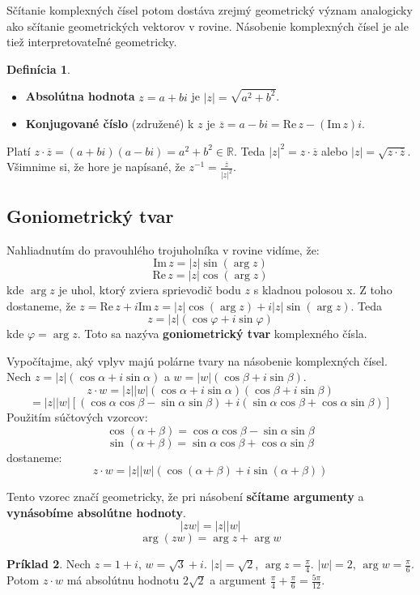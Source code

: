 \documentclass[11pt,a4paper]{article}
\theoremstyle{definition}
\newtheorem{definicia}{Definícia}[section]
\newtheorem{priklad}[definicia]{Príklad}
\theoremstyle{plain}
\theoremstyle{remark}
\newcommand{\R}{\mathbb{R}}
\begin{document}
Sčítanie komplexných čísel potom dostáva zrejmý geometrický význam analogicky ako sčítanie geometrických vektorov v rovine.
Násobenie komplexných čísel je ale tiež interpretovateľné geometricky.

\begin{definicia}
\begin{itemize}
    \item \textbf{Absolútna hodnota} $z = a+bi$ je $|z| = \sqrt{a^2+b^2}$.
    \item \textbf{Konjugované číslo} (združené) k $z$ je $\overline{z} = a-bi = \mathrm{Re}\, z - (\mathrm{Im}\, z)i$.
\end{itemize}
\end{definicia}

Platí $z \cdot \overline{z} = (a+bi)(a-bi) = a^2+b^2 \in \R$. Teda $|z|^2 = z \cdot \overline{z}$ alebo $|z| = \sqrt{z \cdot \overline{z}}$.
Všimnime si, že hore je napísané, že $z^{-1} = \frac{\overline{z}}{|z|^2}$.

\subsection*{Goniometrický tvar}
Nahliadnutím do pravouhlého trojuholníka v rovine vidíme, že:
$$ \mathrm{Im}\, z = |z| \sin(\arg z) $$
$$ \mathrm{Re}\, z = |z| \cos(\arg z) $$
kde $\arg z$ je uhol, ktorý zviera sprievodič bodu $z$ s kladnou polosou x.
Z toho dostaneme, že $z = \mathrm{Re}\, z + i \mathrm{Im}\, z = |z|\cos(\arg z) + i|z|\sin(\arg z)$.
Teda
$$ z = |z|(\cos \varphi + i \sin \varphi) $$
kde $\varphi = \arg z$. Toto sa nazýva \textbf{goniometrický tvar} komplexného čísla.

Vypočítajme, aký vplyv majú polárne tvary na násobenie komplexných čísel. Nech $z = |z|(\cos \alpha + i \sin \alpha)$ a $w = |w|(\cos \beta + i \sin \beta)$.
$$ z \cdot w = |z||w| (\cos \alpha + i \sin \alpha)(\cos \beta + i \sin \beta) $$
$$ = |z||w| [ (\cos \alpha \cos \beta - \sin \alpha \sin \beta) + i (\sin \alpha \cos \beta + \cos \alpha \sin \beta) ] $$
Použitím súčtových vzorcov:
$$ \cos(\alpha+\beta) = \cos \alpha \cos \beta - \sin \alpha \sin \beta $$
$$ \sin(\alpha+\beta) = \sin \alpha \cos \beta + \cos \alpha \sin \beta $$
dostaneme:
$$ z \cdot w = |z||w| (\cos(\alpha+\beta) + i \sin(\alpha+\beta)) $$

Tento vzorec značí geometricky, že pri násobení \textbf{sčítame argumenty} a \textbf{vynásobíme absolútne hodnoty}.
$$ |zw| = |z||w| $$
$$ \arg(zw) = \arg z + \arg w $$

\begin{priklad}
Nech $z = 1+i$, $w = \sqrt{3}+i$.
$|z| = \sqrt{2}$, $\arg z = \frac{\pi}{4}$.
$|w| = 2$, $\arg w = \frac{\pi}{6}$.
Potom $z \cdot w$ má absolútnu hodnotu $2\sqrt{2}$ a argument $\frac{\pi}{4} + \frac{\pi}{6} = \frac{5\pi}{12}$.
\end{priklad}
\end{document}

